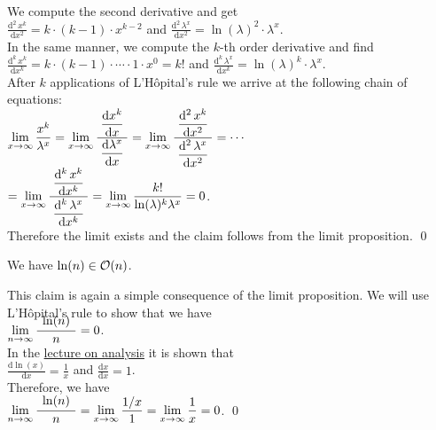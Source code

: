 We compute the second derivative and get \\[0.2cm]
\hspace*{1.3cm}  
$\displaystyle \frac{\mathrm{d}^{2}\,x^{k}}{\mathrm{d}x^2} = k \cdot (k-1) \cdot x^{k-2}$ \quad and \quad 
 $\displaystyle \frac{\mathrm{d}^2\,\lambda^{x}}{\mathrm{d}x^2} = \ln(\lambda)^2 \cdot \lambda^x$. \\[0.2cm]
In the same manner, we compute the $k$-th order derivative and find \\[0.2cm]
\hspace*{1.3cm} 
$\displaystyle \frac{\mathrm{d}^{k}\,x^{k}}{\mathrm{d}x^k} = k \cdot (k-1) \cdot \cdots \cdot 1 \cdot x^{0} = k!$ \quad and \quad 
 $\displaystyle \frac{\mathrm{d}^k\,\lambda^{x}}{\mathrm{d}x^k} = \ln(\lambda)^k \cdot \lambda^x$. \\[0.2cm]
After $k$ applications of L'H\^opital's rule we arrive at the following chain of equations:
\\[0.2cm]
\hspace*{1.3cm} 
$\displaystyle 
\lim\limits_{x \rightarrow \infty} \frac{x^{k}}{\lambda^x} =
\lim\limits_{x \rightarrow \infty} \frac{\displaystyle\;\frac{\mathrm{d}x^{k}}{\mathrm{d}x}\;}{\displaystyle\frac{\mathrm{d}\lambda^x}{\mathrm{d}x}} =
\lim\limits_{x \rightarrow \infty} \frac{\displaystyle\;\frac{\mathrm{d}^2\,x^{k}}{\mathrm{d}x^2}\;}{\displaystyle\frac{\mathrm{d}^2\,\lambda^x}{\mathrm{d}x^2}} =
\cdots$
\\[0.3cm]
\hspace*{2.8cm}
$\displaystyle = 
\lim\limits_{x \rightarrow \infty} \frac{\displaystyle\;\frac{\mathrm{d}^k\,x^{k}}{\mathrm{d}x^k}\;}{\displaystyle\frac{\mathrm{d}^k\,\lambda^x}{\mathrm{d}x^k}} =
\lim\limits_{x \rightarrow \infty} \frac{k!}{\ln(\lambda)^k \lambda^x} = 0$.
\\[0.2cm] 
Therefore the limit exists and the claim follows from the limit proposition.
\qed

\example
We have $\ln(n) \in \mathcal{O}(n)$.

\proof
This claim is again a simple consequence of the limit proposition.  We will use L'H\^opital's rule
to show that we have
\\[0.4cm]
\hspace*{1.3cm} 
$\lim\limits_{n \rightarrow \infty} \bruch{\;\ln(n)\;}{n} = 0$.
\\[0.2cm]
In the \href{https://github.com/karlstroetmann/Analysis/blob/master/Skript/analysis.pdf}{lecture on analysis}
it is shown that \\[0.2cm] 
\hspace*{1.3cm} $\displaystyle \frac{\mathrm{d} \ln(x)}{\mathrm{d}x} = \frac{1}{x}$ 
\quad and \quad
 $\displaystyle \frac{\mathrm{d} x}{\mathrm{d}x} = 1$. \\[0.2cm]
Therefore, we have \\[0.2cm]
\hspace*{1.3cm} 
$\displaystyle \lim\limits_{n \rightarrow \infty} \bruch{\;\ln(n)\;}{n} = 
\lim\limits_{x \rightarrow \infty} \frac{1/x}{1} = 
\lim\limits_{x \rightarrow \infty} \frac{1}{x} = 0$. \qed


